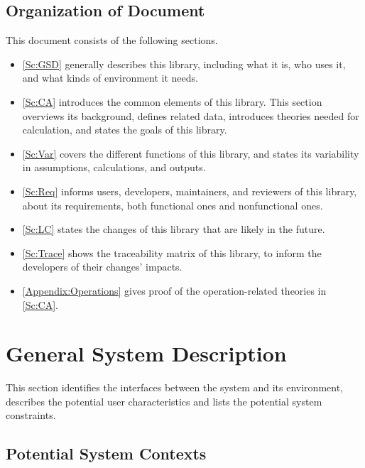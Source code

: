 \documentclass[12pt]{article}
\begin{document}
\subsection{Organization of Document}
This document consists of the following sections.
\begin{itemize}
	\item \autoref{Sc:GSD} generally describes this library, including 
	what it is, who uses it, and what kinds of environment it needs.
	\item \autoref{Sc:CA} introduces the common elements of this library. 
	This section overviews its background, defines related data, 
	introduces theories needed for calculation, 
	and states the goals of this library.
	\item \autoref{Sc:Var} covers the different functions of this library, 
	and states its variability in assumptions, calculations, and outputs.
	\item \autoref{Sc:Req} informs users, developers, maintainers, 
	and reviewers of this library, about its requirements, 
	both functional ones and nonfunctional ones.
	\item \autoref{Sc:LC} states the changes of this library that are 
	likely in the future.
	\item \autoref{Sc:Trace} shows the traceability matrix of this library, 
	to inform the developers of their changes' impacts.
	\item \autoref{Appendix:Operations} gives proof of the 
	operation-related theories in \autoref{Sc:CA}.
\end{itemize}

\section{General System Description}\label{Sc:GSD}

This section identifies the interfaces between the system and its environment,
describes the potential user characteristics and lists the potential system
constraints.

\subsection{Potential System Contexts}
\end{document}
